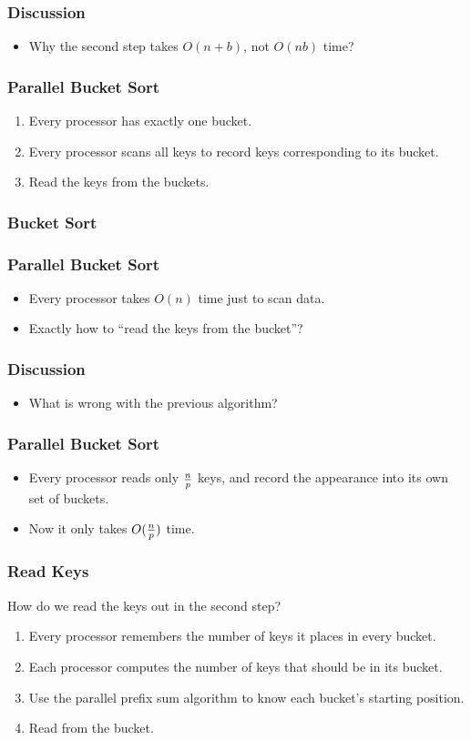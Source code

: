 \documentclass{beamer}
\begin{document}
\begin{CJK}{UTF8}{bsmi}
\begin{frame}
\frametitle{Discussion}
\begin{itemize}
\item Why the second step takes $O(n + b)$, not $O(n b)$ time?
\end{itemize}
\end{frame}

\begin{frame}
\frametitle{Parallel Bucket Sort}
\begin{enumerate}
\item Every processor has exactly one bucket.
\item Every processor scans all keys to record keys corresponding to
  its bucket.
\item Read the keys from the buckets.
\end{enumerate}
\end{frame}


\begin{frame}
\frametitle{Bucket Sort}
\centerline{}
\end{frame}

\begin{frame}
\frametitle{Parallel Bucket Sort}
\begin{itemize}
\item Every processor takes $O(n)$ time just to scan data.
\item Exactly how to ``read the keys from the bucket''?
\end{itemize}
\end{frame}

\begin{frame}
\frametitle{Discussion}
\begin{itemize}
\item What is wrong with the previous algorithm?
\end{itemize}
\end{frame}


\begin{frame}
\frametitle{Parallel Bucket Sort}
\begin{itemize}
\item Every processor reads only $n \over p$ keys, and record the
  appearance into its own set of buckets.
\item Now it only takes $O({n \over p})$ time.
\end{itemize}
\end{frame}

\begin{frame}
\frametitle{Read Keys}
How do we read the keys out in the second step?
\begin{enumerate}
\item Every processor remembers the number of keys it places in every
  bucket.
\item Each processor computes the number of keys that should be in its
  bucket.
\item Use the parallel prefix sum algorithm to know each bucket's starting position.
\item Read from the bucket.
\end{enumerate}
\end{frame}


\end{CJK}
\end{document}
